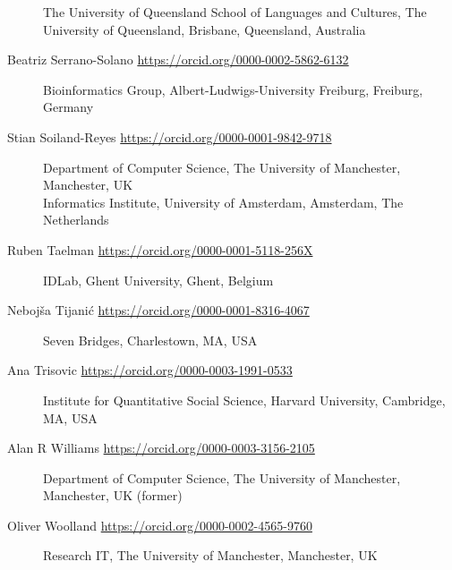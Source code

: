 \begin{description}
The University of Queensland School of Languages and Cultures, The
University of Queensland, Brisbane, Queensland, Australia
\item[Beatriz Serrano-Solano
\url{https://orcid.org/0000-0002-5862-6132}]
Bioinformatics Group, Albert-Ludwigs-University Freiburg, Freiburg,
Germany
\item[Stian Soiland-Reyes \url{https://orcid.org/0000-0001-9842-9718}]
Department of Computer Science, The University of Manchester,
Manchester, UK\\
Informatics Institute, University of Amsterdam, Amsterdam, The
Netherlands
\item[Ruben Taelman \url{https://orcid.org/0000-0001-5118-256X}]
IDLab, Ghent University, Ghent, Belgium
\item[Nebojša Tijanić \url{https://orcid.org/0000-0001-8316-4067}]
Seven Bridges, Charlestown, MA, USA
\item[Ana Trisovic \url{https://orcid.org/0000-0003-1991-0533}]
Institute for Quantitative Social Science, Harvard University,
Cambridge, MA, USA
\item[Alan R Williams \url{https://orcid.org/0000-0003-3156-2105}]
Department of Computer Science, The University of Manchester,
Manchester, UK (former)
\item[Oliver Woolland \url{https://orcid.org/0000-0002-4565-9760}]
Research IT, The University of Manchester, Manchester, UK
\end{description}


